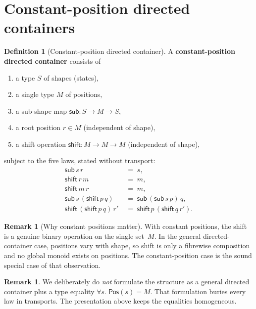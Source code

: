 \documentclass[11pt,a4paper]{article}
\theoremstyle{plain}
\theoremstyle{definition}
\newtheorem{definition}[theorem]{Definition}
\newtheorem{remark}[theorem]{Remark}
\begin{document}
\section{Constant-position directed containers}

\begin{definition}[Constant-position directed container]\label{def:const-dc}
A \textbf{constant-position directed container} consists of
\begin{enumerate}
  \item a type $S$ of shapes (states),
  \item a single type $M$ of positions,
  \item a sub-shape map $\mathsf{sub} : S \to M \to S$,
  \item a root position $r \in M$ (independent of shape),
  \item a shift operation $\mathsf{shift} : M \to M \to M$
        (independent of shape),
\end{enumerate}
subject to the five laws, stated without transport:
\begin{align}
  \mathsf{sub}\,s\,r &\;=\; s, \label{eq:c1}\\
  \mathsf{shift}\,r\,m &\;=\; m, \label{eq:c2}\\
  \mathsf{shift}\,m\,r &\;=\; m, \label{eq:c3}\\
  \mathsf{sub}\,s\,(\mathsf{shift}\,p\,q)
    &\;=\; \mathsf{sub}\,(\mathsf{sub}\,s\,p)\,q, \label{eq:c4}\\
  \mathsf{shift}\,(\mathsf{shift}\,p\,q)\,r'
    &\;=\; \mathsf{shift}\,p\,(\mathsf{shift}\,q\,r'). \label{eq:c5}
\end{align}
\end{definition}

\begin{remark}[Why constant positions matter]
With constant positions, the shift is a genuine binary operation on the
single set~$M$. In the general directed-container case, positions vary
with shape, so shift is only a fibrewise composition and no global monoid
exists on positions. The constant-position case is the sound special
case of that observation.
\end{remark}

\begin{remark}
We deliberately do \emph{not} formulate the structure as a general
directed container plus a type equality $\forall s.\; \mathsf{Pos}(s)=M$.
That formulation buries every law in transports. The presentation above
keeps the equalities homogeneous.
\end{remark}
\end{document}
